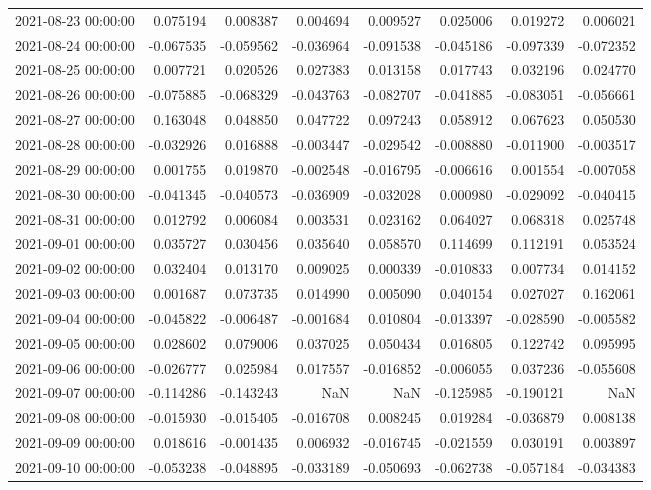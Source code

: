 \begin{tabular}{lrrrrrrr}
2021-08-23 00:00:00 & 0.075194 & 0.008387 & 0.004694 & 0.009527 & 0.025006 & 0.019272 & 0.006021 \\
2021-08-24 00:00:00 & -0.067535 & -0.059562 & -0.036964 & -0.091538 & -0.045186 & -0.097339 & -0.072352 \\
2021-08-25 00:00:00 & 0.007721 & 0.020526 & 0.027383 & 0.013158 & 0.017743 & 0.032196 & 0.024770 \\
2021-08-26 00:00:00 & -0.075885 & -0.068329 & -0.043763 & -0.082707 & -0.041885 & -0.083051 & -0.056661 \\
2021-08-27 00:00:00 & 0.163048 & 0.048850 & 0.047722 & 0.097243 & 0.058912 & 0.067623 & 0.050530 \\
2021-08-28 00:00:00 & -0.032926 & 0.016888 & -0.003447 & -0.029542 & -0.008880 & -0.011900 & -0.003517 \\
2021-08-29 00:00:00 & 0.001755 & 0.019870 & -0.002548 & -0.016795 & -0.006616 & 0.001554 & -0.007058 \\
2021-08-30 00:00:00 & -0.041345 & -0.040573 & -0.036909 & -0.032028 & 0.000980 & -0.029092 & -0.040415 \\
2021-08-31 00:00:00 & 0.012792 & 0.006084 & 0.003531 & 0.023162 & 0.064027 & 0.068318 & 0.025748 \\
2021-09-01 00:00:00 & 0.035727 & 0.030456 & 0.035640 & 0.058570 & 0.114699 & 0.112191 & 0.053524 \\
2021-09-02 00:00:00 & 0.032404 & 0.013170 & 0.009025 & 0.000339 & -0.010833 & 0.007734 & 0.014152 \\
2021-09-03 00:00:00 & 0.001687 & 0.073735 & 0.014990 & 0.005090 & 0.040154 & 0.027027 & 0.162061 \\
2021-09-04 00:00:00 & -0.045822 & -0.006487 & -0.001684 & 0.010804 & -0.013397 & -0.028590 & -0.005582 \\
2021-09-05 00:00:00 & 0.028602 & 0.079006 & 0.037025 & 0.050434 & 0.016805 & 0.122742 & 0.095995 \\
2021-09-06 00:00:00 & -0.026777 & 0.025984 & 0.017557 & -0.016852 & -0.006055 & 0.037236 & -0.055608 \\
2021-09-07 00:00:00 & -0.114286 & -0.143243 & NaN & NaN & -0.125985 & -0.190121 & NaN \\
2021-09-08 00:00:00 & -0.015930 & -0.015405 & -0.016708 & 0.008245 & 0.019284 & -0.036879 & 0.008138 \\
2021-09-09 00:00:00 & 0.018616 & -0.001435 & 0.006932 & -0.016745 & -0.021559 & 0.030191 & 0.003897 \\
2021-09-10 00:00:00 & -0.053238 & -0.048895 & -0.033189 & -0.050693 & -0.062738 & -0.057184 & -0.034383 \\

\end{tabular}
